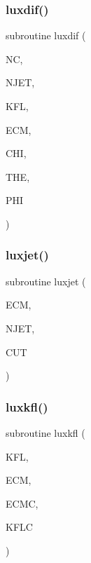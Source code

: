 \mbox{\label{jetset7409_8f_a38fb2f57dc9ce2f56a98e6484f99c12a}} 
\subsubsection{\texorpdfstring{luxdif()}{luxdif()}}
{\footnotesize\ttfamily subroutine luxdif (\begin{DoxyParamCaption}\item[{}]{NC,  }\item[{}]{N\+J\+ET,  }\item[{}]{K\+FL,  }\item[{}]{E\+CM,  }\item[{}]{C\+HI,  }\item[{}]{T\+HE,  }\item[{}]{P\+HI }\end{DoxyParamCaption})}

\mbox{\label{jetset7409_8f_a2fa56de45847b9554a86d38ee8f22cdb}} 
\subsubsection{\texorpdfstring{luxjet()}{luxjet()}}
{\footnotesize\ttfamily subroutine luxjet (\begin{DoxyParamCaption}\item[{}]{E\+CM,  }\item[{}]{N\+J\+ET,  }\item[{}]{C\+UT }\end{DoxyParamCaption})}

\mbox{\label{jetset7409_8f_a5c1cdd9185569769b334e670af014ec9}} 
\subsubsection{\texorpdfstring{luxkfl()}{luxkfl()}}
{\footnotesize\ttfamily subroutine luxkfl (\begin{DoxyParamCaption}\item[{}]{K\+FL,  }\item[{}]{E\+CM,  }\item[{}]{E\+C\+MC,  }\item[{}]{K\+F\+LC }\end{DoxyParamCaption})}

